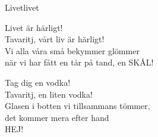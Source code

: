 \begin{song}{Livet}{livet}
\begin{vers}
\repopen Livet är härligt!\\
Tavaritj, vårt liv är härligt!\\
Vi alla våra små bekymmer glömmer\\
när vi har fått en tår på tand, en SKÅL!\\
\end{vers}
\begin{vers}
Tag dig en vodka!\\
Tavaritj, en liten vodka!\\
Glasen i botten vi tillsammans tömmer,\\
det kommer mera efter hand \repclose\\
HEJ!\\
\end{vers}
\end{song}
